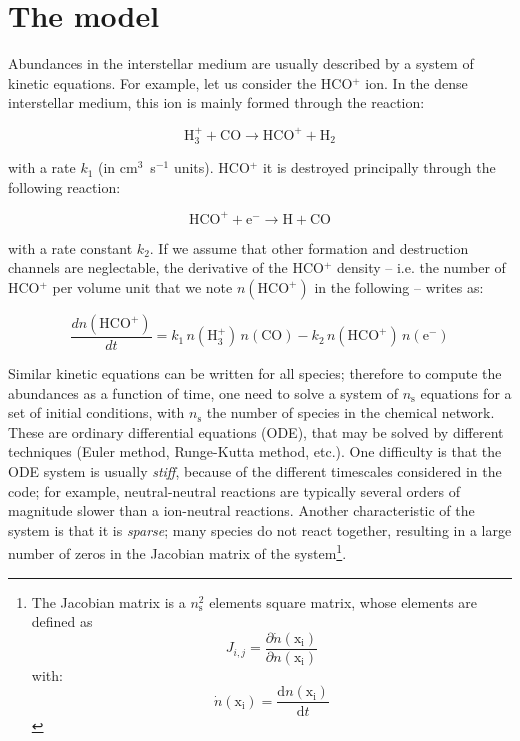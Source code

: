 \documentclass[a4paper,12pt]{article}
\newcommand{\conc}[1]{n(\mathrm{#1})}
\begin{document}
\section{The model}
\label{sec:model}

Abundances in the interstellar medium are usually described by a
system of kinetic equations. For example, let us consider the
HCO$^{+}$ ion. In the dense interstellar medium, this ion is mainly
formed through the reaction:

\begin{equation}
  \mathrm{H_{3}^{+} + CO \rightarrow HCO^{+} + H_{2}}
  \label{eq:hcop-formation}
\end{equation}

\noindent
with a rate $k_{1}$ (in cm$^{3}$~s$^{-1}$ units). HCO$^{+}$ it is
destroyed principally through the following reaction:

\begin{equation}
  \mathrm{HCO^{+} + e^{-} \rightarrow H + CO}
  \label{eq:hcop-destruction}
\end{equation}

\noindent
with a rate constant $k_{2}$. If we assume that other formation and
destruction channels are neglectable, the derivative of the HCO$^{+}$
density -- i.e. the number of HCO$^{+}$ per volume unit that we note
$\conc{HCO^{+}}$ in the following -- writes as:

\begin{equation}
  \frac{d\conc{HCO^{+}}}{dt} = k_{1} \, \conc{H_{3}^{+}} \, \conc{CO}
  - k_{2} \, \conc{HCO^{+}} \, \conc{e^{-}}
\end{equation}

Similar kinetic equations can be written for all species; therefore to
compute the abundances as a function of time, one need to solve a
system of $n_\mathrm{s}$ equations for a set of initial conditions,
with $n_\mathrm{s}$ the number of species in the chemical
network. These are ordinary differential equations (ODE), that may be
solved by different techniques (Euler method, Runge-Kutta method,
etc.). One difficulty is that the ODE system is usually \emph{stiff},
because of the different timescales considered in the code; for
example, neutral-neutral reactions are typically several orders of
magnitude slower than a ion-neutral reactions. Another characteristic
of the system is that it is \emph{sparse}; many species do not react
together, resulting in a large number of zeros in the Jacobian matrix
of the system\footnote{The Jacobian matrix is a $n_\mathrm{s}^2$
  elements square matrix, whose elements are defined as
  \begin{equation}
     J_{i,j} = \frac{\partial
       \dot\conc{x_{i}}}{\partial \conc{x_{i}}}
   \end{equation}
   \noindent
   with:
   \begin{equation}
     \dot\conc{x_{i}} = \frac{\mathrm{d} \conc{x_{i}}}{\mathrm{d}t}
   \end{equation}}.
\end{document}
